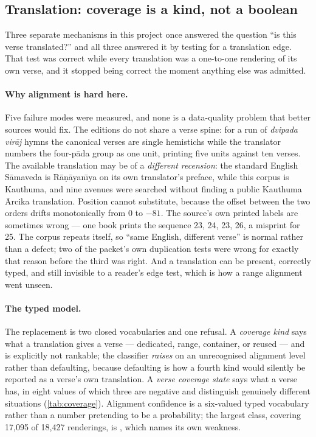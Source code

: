 \subsection{Translation: coverage is a kind, not a boolean}
\label{sec:translation}

Three separate mechanisms in this project once answered the question ``is this verse
translated?'' and all three answered it by testing for a translation edge. That test
was correct while every translation was a one-to-one rendering of its own verse, and
it stopped being correct the moment anything else was admitted.

\paragraph{Why alignment is hard here.} Five failure modes were measured, and none is
a data-quality problem that better sources would fix. The editions do not share a
verse spine: for a run of \emph{dvipada vir\=aj} hymns the canonical verses are single
hemistichs while the translator numbers the four-p\=ada group as one unit, printing
five units against ten verses. The available translation may be of a \emph{different
recension}: the standard English S\=amaveda is R\=a\d{n}\=ayan\=\i ya on its own
translator's preface, while this corpus is Kauthuma, and nine avenues were searched
without finding a public Kauthuma \=Arcika translation. Position cannot substitute,
because the offset between the two orders drifts monotonically from 0 to $-81$. The
source's own printed labels are sometimes wrong --- one book prints the sequence
23, 24, 23, 26, a misprint for 25. The corpus repeats itself, so ``same English,
different verse'' is normal rather than a defect; two of the packet's own duplication
tests were wrong for exactly that reason before the third was right. And a
translation can be present, correctly typed, and still invisible to a reader's edge
test, which is how a range alignment went unseen.

\paragraph{The typed model.} The replacement is two closed vocabularies and one
refusal. A \emph{coverage kind} says what a translation gives a verse --- dedicated,
range, container, or reused --- and is explicitly not rankable; the classifier
\emph{raises} on an unrecognised alignment level rather than defaulting, because
defaulting is how a fourth kind would silently be reported as a verse's own
translation. A \emph{verse coverage state} says what a verse has, in eight values of
which three are negative and distinguish genuinely different situations
(\cref{tab:coverage}). Alignment confidence is a six-valued typed vocabulary rather
than a number pretending to be a probability; the largest class, covering 17{,}095 of
18{,}427 renderings, is , which names
its own weakness.

